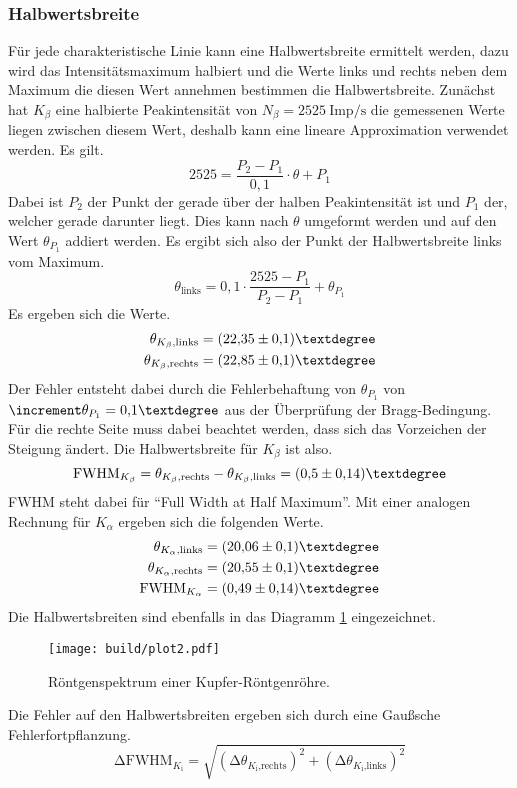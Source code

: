 \subsubsection{Halbwertsbreite}
Für jede charakteristische Linie kann eine Halbwertsbreite ermittelt werden, dazu wird das Intensitätsmaximum halbiert und die Werte links und rechts neben dem Maximum die diesen Wert
annehmen bestimmen die Halbwertsbreite.
Zunächst hat $K_{\beta}$ eine halbierte Peakintensität von $N_{\beta} = \SI{2525}{{\text{Imp}}\per\second}$ die gemessenen Werte liegen zwischen diesem Wert, deshalb kann eine
lineare Approximation verwendet werden. Es gilt.
\begin{equation}
2525 = \frac{P_{2}-P_{1}}{0{,}1} \cdot \theta + P_{1}
\end{equation}
Dabei ist $P_{2}$ der Punkt der gerade über der halben Peakintensität ist und $P_{1}$ der, welcher gerade darunter liegt.
Dies kann nach $\theta$ umgeformt werden und auf den Wert $\theta_{P_{1}}$ addiert werden. Es ergibt sich also der Punkt der Halbwertsbreite links vom Maximum.
\begin{equation}
\theta_{\text{links}} = 0{,}1 \cdot \frac{2525-P_{1}}{P_{2}-P_{1}} + \theta_{P_{1}}
\end{equation}
Es ergeben sich die Werte.
\begin{align}
\theta_{K_{\beta}\text{,links}} &= (22{,}35 \pm 0{,}1)\textdegree\\
\theta_{K_{\beta}\text{,rechts}} &= (22{,}85\pm 0{,}1)\textdegree
\end{align}
Der Fehler entsteht dabei durch die Fehlerbehaftung von $\theta_{P_{1}}$ von $\increment \theta_{P_{1}} = 0{,}1\textdegree$ aus der Überprüfung der Bragg-Bedingung.
Für die rechte Seite muss dabei beachtet werden, dass sich das Vorzeichen der Steigung ändert.
Die Halbwertsbreite für $K_{\beta}$ ist also.
\begin{equation}
\text{FWHM}_{K_{\beta}} = \theta_{K_{\beta}\text{,rechts}} - \theta_{K_{\beta}\text{,links}} = (0{,}5 \pm 0{,}14)\textdegree
\end{equation}
FWHM steht dabei für \enquote{Full Width at Half Maximum}.
Mit einer analogen Rechnung für $K_{\alpha}$ ergeben sich die folgenden Werte.
\begin{align}
\theta_{K_{\alpha}\text{,links}} &= (20{,}06\pm 0{,}1)\textdegree \\
\theta_{K_{\alpha}\text{,rechts}} &= (20{,}55\pm 0{,}1)\textdegree \\
\text{FWHM}_{K_{\alpha}} &=  (0{,}49 \pm 0{,}14)\textdegree
\end{align}
Die Halbwertsbreiten sind ebenfalls in das Diagramm \ref{fig:plot2} eingezeichnet.
\begin{figure}[h]
  \centering
  \texttt{[image: build/plot2.pdf]}
  \caption{Röntgenspektrum einer Kupfer-Röntgenröhre.}
  \label{fig:plot2}
\end{figure}
Die Fehler auf den Halbwertsbreiten ergeben sich durch eine Gaußsche Fehlerfortpflanzung.
\begin{equation}
\increment \text{FWHM}_{K_{\text{i}}} = \sqrt{(\increment \theta_{K_{\text{i}}\text{,rechts}})^{2} + (\increment \theta_{K_{\text{i}}\text{,links}})^{2}}
\end{equation}
